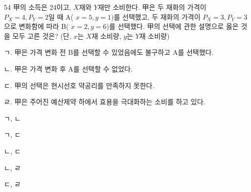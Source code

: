 \begin{question}{54}
甲의 소득은 24이고, $X$재와 $Y$재만 소비한다. 甲은 두 재화의 가격이 $P_{X}=4,P_{Y}=2$일 때 A( $x=5,y=1$)를 선택했고, 두 재화의 가격이 $P_{X}=3,P_{Y}=3$으로 변화함에 따라 B( $x=2,y=6$)를 선택했다. 甲의 선택에 관한 설명으로 옳은 것을 모두 고른 것은? (단, $x$는 $X$재 소비량, $y$는 $Y$재 소비량)
\begin{framedtext}
ㄱ. 甲은 가격 변화 전 B를 선택할 수 있었음에도 불구하고 A를 선택했다. \par
ㄴ. 甲은 가격 변화 후 A를 선택할 수 없었다. \par
ㄷ. 甲의 선택은 현시선호 약공리를 만족하지 못한다. \par
ㄹ. 甲은 주어진 예산제약 하에서 효용을 극대화하는 소비를 하고 있다. \par
\end{framedtext}
\begin{choices}
  \item ㄱ, ㄴ
  \item ㄱ, ㄷ
  \item ㄴ, ㄷ
  \item ㄴ, ㄹ
  \item ㄷ, ㄹ
\end{choices}
\end{question}
